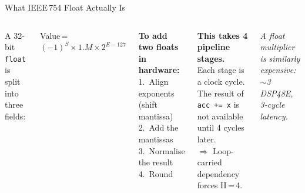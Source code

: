 \documentclass[aspectratio=169,12pt]{beamer}
\begin{document}
\begin{frame}{What IEEE\,754 Float Actually Is}
\vspace{0.1cm}
\begin{columns}[T,totalwidth=\textwidth]

  \vspace{0.1cm}

  {\small A 32-bit \texttt{float} is split into three fields:}
  \vspace{6pt}


  \vspace{8pt}
  {\small Value\,=\,$(-1)^S \times 1.M \times 2^{E-127}$}

  \vspace{8pt}
  \colorbox{Navy!8}{\parbox{\dimexpr\linewidth-2\fboxsep\relax}{\vspace{3pt}
    {\small\color{Navy}\bfseries To add two floats in hardware:}\\[2pt]
    {\small 1.\ Align exponents (shift mantissa)\\
    2.\ Add the mantissas\\
    3.\ Normalise the result\\
    4.\ Round}
  \vspace{3pt}}}

  \vspace{0.1cm}

  \colorbox{Orange!10}{\parbox{\dimexpr\linewidth-2\fboxsep\relax}{\vspace{4pt}
    {\color{Orange}\bfseries This takes 4 pipeline stages.}\\[3pt]
    {\small Each stage is a clock cycle. The result
    of \texttt{acc\,+=\,x} is not available until
    4 cycles later.}\\[3pt]
    {\small\color{Navy}$\Rightarrow$ Loop-carried dependency forces II\,=\,4.}
  \vspace{4pt}}}

  \vspace{10pt}
  {\small\color{MidGray}\itshape A float \emph{multiplier} is similarly expensive:
  $\sim$3 DSP48E, 3-cycle latency.}

\end{columns}
\end{frame}
\end{document}
